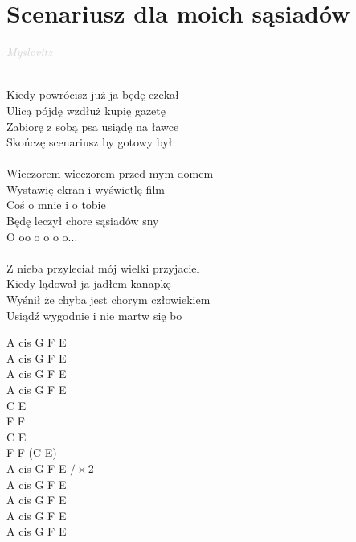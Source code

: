 \documentclass[a5paper, 10pt]{book}
\begin{document}
\section{Scenariusz dla moich sąsiadów}\textcolor{lightgray}{\textit{Myslovitz}}\\~\\
\begin{minipage}[t]{0.8\textwidth}
  Kiedy powrócisz już ja będę czekał\\
  Ulicą pójdę wzdłuż kupię gazetę\\
  Zabiorę z sobą psa usiądę na ławce\\
  Skończę scenariusz by gotowy był\\
  \\
  \hspace*{5mm}Wieczorem wieczorem przed mym domem\\
  \hspace*{5mm}Wystawię ekran i wyświetlę film\\
  \hspace*{5mm}Coś o mnie i o tobie\\
  \hspace*{5mm}Będę leczył chore sąsiadów sny\\

  \hspace*{8mm}O oo o o o o...\\
  \\
  Z nieba przyleciał mój wielki przyjaciel\\
  Kiedy lądował ja jadłem kanapkę\\
  Wyśnił że chyba jest chorym człowiekiem\\
  Usiądź wygodnie i nie martw się bo\\
\end{minipage}
\begin{minipage}[t]{0.2\textwidth}
  A cis G F E\\
  A cis G F E\\
  A cis G F E\\
  A cis G F E\\

  C E\\
  F F\\
  C E\\
  F F (C E)\\

  A cis G F E $/ \times$2\\

  A cis G F E\\
  A cis G F E\\
  A cis G F E\\
  A cis G F E\\

\end{minipage}
\end{document}

